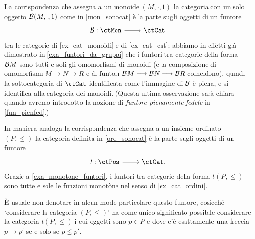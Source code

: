 \begin{example}\label{funtore_mon_to_cat}
	La corrispondenza che assegna a un monoide \((M,\cdot,1)\) la categoria con un solo oggetto \(\mathcal{B}(M,\cdot,1)\) come in \ref{mon_sonocat} è la parte sugli oggetti di un funtore
	\[\dmFun{\susp}{\ctMon}{\ctCat}\]
	tra le categorie di \ref{ex_cat_monoidi} e di \ref{ex_cat_cat}; abbiamo in effetti già dimostrato in \ref{exa_funtori_da_gruppi} che i funtori tra categorie della forma \(\mathcal{B} M\) sono tutti e soli gli omomorfismi di monoidi (e la composizione di omomorfismi \(M\to N\to R\) e di funtori \(\mathcal{B} M \longrightarrow\mathcal{B} N \longrightarrow\mathcal{B} R\) coincidono), quindi la sottocategoria di \(\ctCat\) identificata come l'immagine di \(\mathcal{B}\) è piena, e si identifica alla categoria dei monoidi. (Questa ultima osservazione sarà chiara quando avremo introdotto la nozione di \emph{funtore pienamente fedele} in \ref{fun_pienfed}.)
\end{example}
\begin{remark}\label{ord_come_cat}
	In maniera analoga la corrispondenza che assegna a un insieme ordinato \((P,\le)\) la categoria definita in \ref{ord_sonocat} è la parte sugli oggetti di un funtore
	\[\dmFun{t}{\ctPos}{\ctCat.}\]
	Grazie a \ref{exa_monotone_funtori}, i funtori tra categorie della forma \(t(P,\le)\) sono tutte e sole le funzioni monotòne nel senso di \ref{ex_cat_ordini}.

	\`E usuale non denotare in alcun modo particolare questo funtore, cosicché `considerare la categoria \((P,\le)\)' ha come unico significato possibile considerare la categoria \(t(P,\le)\) i cui oggetti sono \(p\in P\) e dove c'è esattamente una freccia \(p\to p'\) se e solo se \(p\le p'\).
\end{remark}
